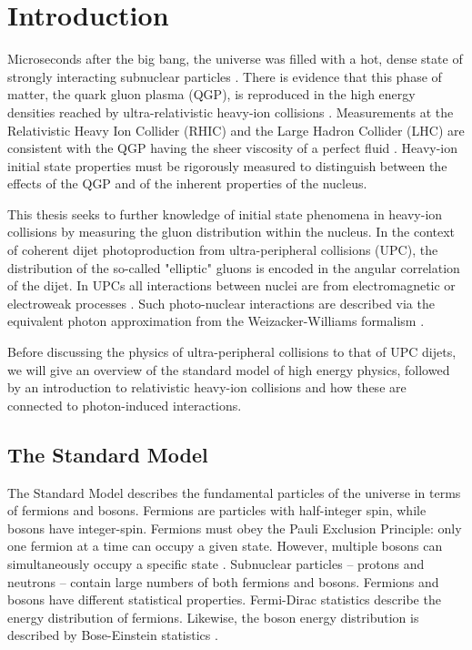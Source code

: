 \setlength\abovedisplayskip{0.4pt}
\setlength\belowdisplayskip{0.4pt}

\chapter{Introduction}

Microseconds after the big bang, the universe was filled with a hot, dense state of strongly interacting subnuclear particles \cite{Rafelski:2013obw}. There is evidence that this phase of matter, the quark gluon plasma (QGP), is reproduced in the high energy densities reached by ultra-relativistic heavy-ion collisions \cite{Arsene:2004fa}. Measurements at the Relativistic Heavy Ion Collider (RHIC) and the Large Hadron Collider (LHC) are consistent with the QGP having the sheer viscosity of a perfect fluid \cite{Long:796947}. Heavy-ion initial state properties must be rigorously measured to distinguish between the effects of the QGP and of the inherent properties of the nucleus.

This thesis seeks to further knowledge of initial state phenomena in heavy-ion collisions by measuring the gluon distribution within the nucleus. In the context of coherent dijet photoproduction from ultra-peripheral collisions (UPC), the distribution of the so-called "elliptic" gluons is encoded in the angular correlation of the dijet\cite{Hagiwara:2016kam}. In UPCs all interactions between nuclei are from electromagnetic or electroweak processes \cite{Contreras:2015dqa}. Such photo-nuclear interactions are described via the equivalent photon approximation from the Weizacker-Williams formalism \cite{vonWeizsacker:1934sx}\cite{Williams:1934ad}. 

Before discussing the physics of ultra-peripheral collisions to that of UPC dijets, we will give an overview of the standard model of high energy physics, followed by an introduction to relativistic heavy-ion collisions and how these are connected to photon-induced interactions. 

\section{The Standard Model}

The Standard Model describes the fundamental particles of the universe in terms of fermions and bosons. Fermions are particles with half-integer spin, while bosons have integer-spin. Fermions must obey the Pauli Exclusion Principle: only one fermion at a time can occupy a given state. However, multiple bosons can simultaneously occupy a specific state \cite{Dyson:1967:SM}. Subnuclear particles -- protons and neutrons -- contain large numbers of both fermions and bosons. Fermions and bosons have different statistical properties. Fermi-Dirac statistics describe the energy distribution of fermions. Likewise, the boson energy distribution is described by Bose-Einstein statistics \cite{Huang_1987}. 

